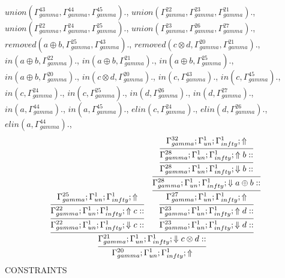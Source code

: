 \documentclass[a4paper, 11pt]{article}
\begin{document}
$union(\Gamma_{gamma}^{43}, \Gamma_{gamma}^{44}, \Gamma_{gamma}^{45}).$, $union(\Gamma_{gamma}^{22}, \Gamma_{gamma}^{23}, \Gamma_{gamma}^{21}).$, $union(\Gamma_{gamma}^{22}, \Gamma_{gamma}^{24}, \Gamma_{gamma}^{25}).$, $union(\Gamma_{gamma}^{23}, \Gamma_{gamma}^{26}, \Gamma_{gamma}^{27}).$, $removed(a \oplus b, \Gamma_{gamma}^{25}, \Gamma_{gamma}^{43}).$, $removed(c \otimes d, \Gamma_{gamma}^{20}, \Gamma_{gamma}^{21}).$, $in(a \oplus b, \Gamma_{gamma}^{22}).$, $in(a \oplus b, \Gamma_{gamma}^{21}).$, $in(a \oplus b, \Gamma_{gamma}^{25}).$, $in(a \oplus b, \Gamma_{gamma}^{20}).$, $in(c \otimes d, \Gamma_{gamma}^{20}).$, $in(c, \Gamma_{gamma}^{43}).$, $in(c, \Gamma_{gamma}^{45}).$, $in(c, \Gamma_{gamma}^{24}).$, $in(c, \Gamma_{gamma}^{25}).$, $in(d, \Gamma_{gamma}^{26}).$, $in(d, \Gamma_{gamma}^{27}).$, $in(a, \Gamma_{gamma}^{44}).$, $in(a, \Gamma_{gamma}^{45}).$, $elin(c, \Gamma_{gamma}^{24}).$, $elin(d, \Gamma_{gamma}^{26}).$, $elin(a, \Gamma_{gamma}^{44}).$, 
{\small
\[
\infer{\Gamma_{ gamma}^{20} ; \Gamma_{un}^{1} ; \Gamma_{ infty}^{1} ;  \Uparrow }
{\infer{\Gamma_{ gamma}^{21} ; \Gamma_{un}^{1} ; \Gamma_{ infty}^{1} ;  \Downarrow c \otimes d :: }
{\infer{\Gamma_{ gamma}^{22} ; \Gamma_{un}^{1} ; \Gamma_{ infty}^{1} ;  \Downarrow c :: }
{\infer{\Gamma_{ gamma}^{22} ; \Gamma_{un}^{1} ; \Gamma_{ infty}^{1} ;  \Uparrow c :: }
{\Gamma_{ gamma}^{25} ; \Gamma_{un}^{1} ; \Gamma_{ infty}^{1} ;  \Uparrow }}
&
\infer{\Gamma_{ gamma}^{23} ; \Gamma_{un}^{1} ; \Gamma_{ infty}^{1} ;  \Downarrow d :: }
{\infer{\Gamma_{ gamma}^{23} ; \Gamma_{un}^{1} ; \Gamma_{ infty}^{1} ;  \Uparrow d :: }
{\infer{\Gamma_{ gamma}^{27} ; \Gamma_{un}^{1} ; \Gamma_{ infty}^{1} ;  \Uparrow }
{\infer{\Gamma_{ gamma}^{28} ; \Gamma_{un}^{1} ; \Gamma_{ infty}^{1} ;  \Downarrow a \oplus b :: }
{\infer{\Gamma_{ gamma}^{28} ; \Gamma_{un}^{1} ; \Gamma_{ infty}^{1} ;  \Downarrow b :: }
{\infer{\Gamma_{ gamma}^{28} ; \Gamma_{un}^{1} ; \Gamma_{ infty}^{1} ;  \Uparrow b :: }
{\Gamma_{ gamma}^{32} ; \Gamma_{un}^{1} ; \Gamma_{ infty}^{1} ;  \Uparrow }}}}}}}}
\]
}
CONSTRAINTS
\end{document}
